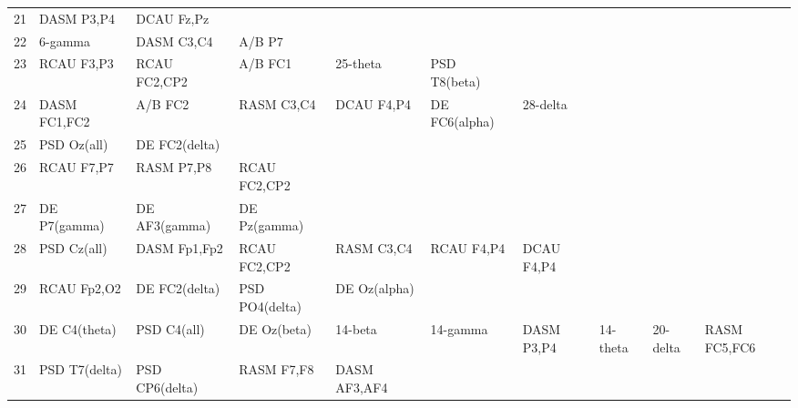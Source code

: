 \begin{landscape}
\begin{table}[]
\begin{tabular}{l|llllllll}
21       & DASM P3,P4     & DCAU Fz,Pz     &                &                &                &                &               &                &               &               \\
22       & 6-gamma        & DASM C3,C4     & A/B P7         &                &                &                &               &                &               &               \\
23       & RCAU F3,P3     & RCAU FC2,CP2   & A/B FC1        & 25-theta       & PSD T8(beta)   &                &               &                &               &               \\
24       & DASM FC1,FC2   & A/B FC2        & RASM C3,C4     & DCAU F4,P4     & DE FC6(alpha)  & 28-delta       &               &                &               &               \\
25       & PSD Oz(all)    & DE FC2(delta)  &                &                &                &                &               &                &               &               \\
26       & RCAU F7,P7     & RASM P7,P8     & RCAU FC2,CP2   &                &                &                &               &                &               &               \\
27       & DE P7(gamma)   & DE AF3(gamma)  & DE Pz(gamma)   &                &                &                &               &                &               &               \\
28       & PSD Cz(all)    & DASM Fp1,Fp2   & RCAU FC2,CP2   & RASM C3,C4     & RCAU F4,P4     & DCAU F4,P4     &               &                &               &               \\
29       & RCAU Fp2,O2    & DE FC2(delta)  & PSD PO4(delta) & DE Oz(alpha)   &                &                &               &                &               &               \\
30       & DE C4(theta)   & PSD C4(all)    & DE Oz(beta)    & 14-beta        & 14-gamma       & DASM P3,P4     & 14-theta      & 20-delta       & RASM FC5,FC6  &               \\
31       & PSD T7(delta)  & PSD CP6(delta) & RASM F7,F8     & DASM AF3,AF4   &                &                &               &                &               &               \\
\end{tabular}
\end{table}
\end{landscape}
\clearpage
